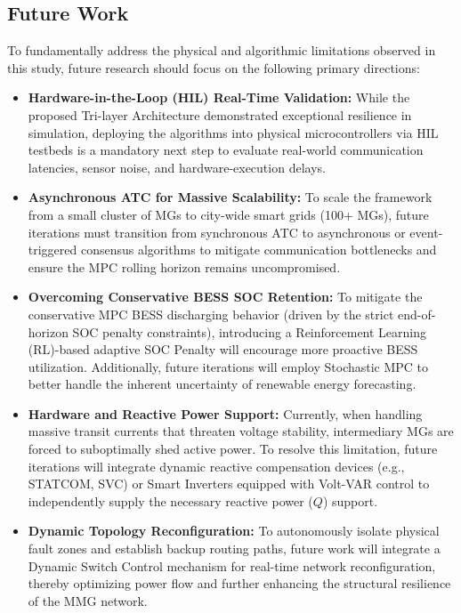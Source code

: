 \subsection{Future Work}
To fundamentally address the physical and algorithmic limitations observed in this study, future research should focus on the following primary directions:
\begin{itemize}
    \item \textbf{Hardware-in-the-Loop (HIL) Real-Time Validation:} While the proposed Tri-layer Architecture demonstrated exceptional resilience in simulation, deploying the algorithms into physical microcontrollers via HIL testbeds is a mandatory next step to evaluate real-world communication latencies, sensor noise, and hardware-execution delays.
    \item \textbf{Asynchronous ATC for Massive Scalability:} To scale the framework from a small cluster of MGs to city-wide smart grids (100+ MGs), future iterations must transition from synchronous ATC to asynchronous or event-triggered consensus algorithms to mitigate communication bottlenecks and ensure the MPC rolling horizon remains uncompromised.
    \item \textbf{Overcoming Conservative BESS SOC Retention:} To mitigate the conservative MPC BESS discharging behavior (driven by the strict end-of-horizon SOC penalty constraints), introducing a Reinforcement Learning (RL)-based adaptive SOC Penalty will encourage more proactive BESS utilization. Additionally, future iterations will employ Stochastic MPC to better handle the inherent uncertainty of renewable energy forecasting.
    \item \textbf{Hardware and Reactive Power Support:} Currently, when handling massive transit currents that threaten voltage stability, intermediary MGs are forced to suboptimally shed active power. To resolve this limitation, future iterations will integrate dynamic reactive compensation devices (e.g., STATCOM, SVC) or Smart Inverters equipped with Volt-VAR control to independently supply the necessary reactive power ($Q$) support.
    \item \textbf{Dynamic Topology Reconfiguration:} To autonomously isolate physical fault zones and establish backup routing paths, future work will integrate a Dynamic Switch Control mechanism for real-time network reconfiguration, thereby optimizing power flow and further enhancing the structural resilience of the MMG network.
\end{itemize}
